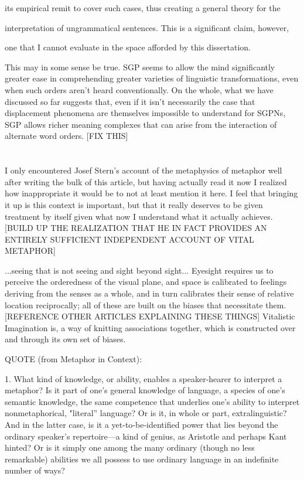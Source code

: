 \documentclass[]{article}
\begin{document}
its empirical remit to cover such cases, thus creating a general theory for the

interpretation of ungrammatical sentences. This is a significant claim, however,

one that I cannot evaluate in the space afforded by this dissertation.



This may in some sense be true. SGP seems to allow the mind significantly greater ease in comprehending greater varieties of linguistic transformations, even when such orders aren't heard conventionally. On the whole, what we have discussed so far suggests that, even if it isn't necessarily the case that displacement phenomena are themselves impossible to understand for SGPNs, SGP allows richer meaning complexes that can arise from the interaction of alternate word orders.  [FIX THIS]



\section{}



I only encountered Josef Stern's account of the metaphysics of metaphor well after writing the bulk of this article, but having actually read it now I realized how inappropriate it would be to not at least mention it here. I feel that bringing it up is this context is important, but that it really deserves to be given treatment by itself given what now I understand what it actually achieves. [BUILD UP THE REALIZATION THAT HE IN FACT PROVIDES AN ENTIRELY SUFFICIENT INDEPENDENT ACCOUNT OF VITAL METAPHOR]

...seeing that is not seeing and sight beyond sight... Eyesight requires us to perceive the orderedness of the visual plane, and space is calibrated to feelings deriving from the senses as a whole, and in turn calibrates their sense of relative location reciprocally; all of these are built on the biases that necessitate them. [REFERENCE OTHER ARTICLES EXPLAINING THESE THINGS] Vitalistic Imagination is, a way of knitting associations together, which is constructed over and through its own set of biases.





QUOTE (from Metaphor in Context):



1. What kind of knowledge, or ability, enables a speaker-hearer to interpret a metaphor? Is it part of one's general knowledge of language, a species of one's semantic knowledge, the same competence that underlies one's ability to interpret nonmetaphorical, "literal'' language? Or is it, in whole or part, extralinguistic? And in the latter case, is it a yet-to-be-identified power that lies beyond the ordinary speaker's repertoire—a kind of genius, as Aristotle and perhaps Kant hinted? Or is it simply one among the many ordinary (though no less remarkable) abilities we all possess to use ordinary language in an indefinite number of ways?
\end{document}
